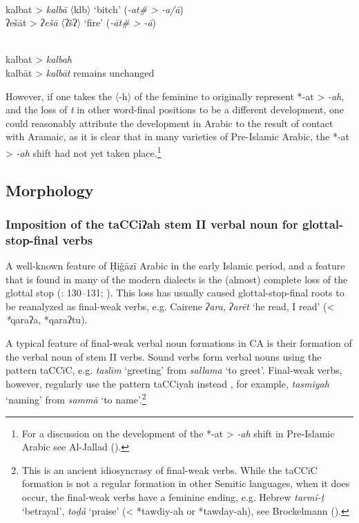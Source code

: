 \documentclass[output=paper]{langsci/langscibook}
\begin{document}
 \\
\ea *kalbat > \textit{kalbā} 〈klb〉 ‘bitch’ (\textit{-at\# > -a/ā})\\
\ex *ʔešāt > \textit{ʔešā}   〈ʔšʔ〉 ‘fire’ (\textit{-āt\# > -ā})\\
\z
\z

 \\
\ea *kalbat > \textit{kalbah}\\
\ex *kalbāt > \textit{kalbāt} remains unchanged \\
\z
\z

However, if one takes the 〈-h〉 of the feminine to originally represent *-at > \textit{-ah}, and the loss of \textit{t} in other word-final positions to be a different development, one could reasonably attribute the development in Arabic to the result of contact with Aramaic, as it is clear that in many varieties of Pre-Islamic Arabic, the *-at > \textit{-ah} shift had not yet taken place.\footnote{For a discussion on the development of the *-at > \textit{-ah} shift in Pre-Islamic Arabic see Al-Jallad (\citeyear[157--158]{Al-Jallad2017Greek}).}

\subsection{\label{bkm:Ref13577493}Morphology}
\subsubsection{\label{bkm:Ref13224791}Imposition of the taCCiʔah stem II verbal noun for glottal-stop-final verbs}

A well-known feature of Ḥiǧāzī Arabic in the early Islamic period, and a feature that is found in many of the modern dialects is the (almost) complete loss of the glottal stop (\citealt{Rabin1951}: 130--131; \citealt{vanPutten2018}). This loss has usually caused glottal-stop-final roots to be reanalyzed as final-weak verbs, e.g. Cairene \textit{ʔara,} \textit{ʔarēt} ‘he read, I read’ (< \textit{*}qaraʔa, *qaraʔtu).

A typical feature of final-weak verbal noun formations in CA is their formation of the verbal noun of stem II verbs. Sound verbs form verbal nouns using the pattern taCCīC, e.g. \textit{taslīm} ‘greeting’ from \textit{sallama} ‘to greet’. Final-weak verbs, however, regularly use the pattern taCCiyah instead \citep[44]{Fischer2002}, for example, \textit{tasmiyah} ‘naming’ from \textit{sammā} ‘to name’.\footnote{This is an ancient idiosyncrasy of final-weak verbs. While the taCCīC formation is not a regular formation in other Semitic languages, when it does occur, the final-weak verbs have a feminine ending, e.g. Hebrew \textit{tarmi-ṯ} ‘betrayal’, \textit{toḏå} ‘praise’ (< *tawdiy-ah or *tawday-ah), see Brockelmann (\citeyear[385--387]{Brockelmann1908}).} 
\end{document}
